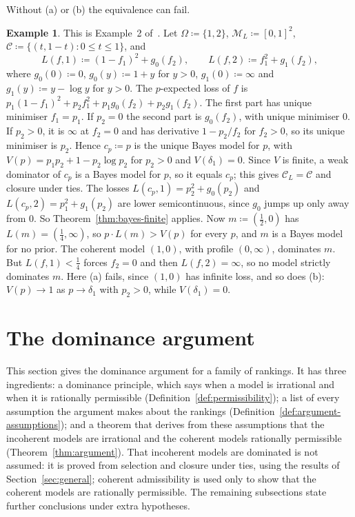 \documentclass[11pt]{article}
\theoremstyle{definition}
\newtheorem{example}[theorem]{Example}
\theoremstyle{remark}
\newcommand{\M}{\mathcal M}
\newcommand{\C}{\mathcal C}
\begin{document}
Without (a) or (b) the equivalence can fail.
\begin{example}\label{ex:ssk-sharp}
This is Example~2 of~\cite{SSK09}. Let $\Omega\coloneqq\{1,2\}$, $\M_L\coloneqq[0,1]^2$, $\C\coloneqq\{(t,1-t):0\le t\le1\}$, and
\[
L(f,1)\coloneqq(1-f_1)^2+g_0(f_2),\qquad L(f,2)\coloneqq f_1^2+g_1(f_2),
\]
where $g_0(0)\coloneqq0$, $g_0(y)\coloneqq1+y$ for $y>0$, $g_1(0)\coloneqq\infty$ and $g_1(y)\coloneqq y-\log y$ for $y>0$. The $p$-expected loss of $f$ is $p_1(1-f_1)^2+p_2f_1^2+p_1g_0(f_2)+p_2g_1(f_2)$. The first part has unique minimiser $f_1=p_1$. If $p_2=0$ the second part is $g_0(f_2)$, with unique minimiser $0$. If $p_2>0$, it is $\infty$ at $f_2=0$ and has derivative $1-p_2/f_2$ for $f_2>0$, so its unique minimiser is $p_2$. Hence $c_p\coloneqq p$ is the unique Bayes model for $p$, with $V(p)=p_1p_2+1-p_2\log p_2$ for $p_2>0$ and $V(\delta_1)=0$. Since $V$ is finite, a weak dominator of $c_p$ is a Bayes model for $p$, so it equals $c_p$; this gives $\C_L=\C$ and closure under ties. The losses $L(c_p,1)=p_2^2+g_0(p_2)$ and $L(c_p,2)=p_1^2+g_1(p_2)$ are lower semicontinuous, since $g_0$ jumps up only away from $0$. So Theorem~\ref{thm:bayes-finite} applies. Now $m\coloneqq(\frac12,0)$ has $L(m)=(\frac14,\infty)$, so $p\cdot L(m)>V(p)$ for every $p$, and $m$ is a Bayes model for no prior. The coherent model $(1,0)$, with profile $(0,\infty)$, dominates $m$. But $L(f,1)<\frac14$ forces $f_2=0$ and then $L(f,2)=\infty$, so no model strictly dominates $m$. Here (a) fails, since $(1,0)$ has infinite loss, and so does (b): $V(p)\to1$ as $p\to\delta_1$ with $p_2>0$, while $V(\delta_1)=0$.
\end{example}

\section{The dominance argument}\label{sec:conclusion}
This section gives the dominance argument for a family of rankings. It has three ingredients: a dominance principle, which says when a model is irrational and when it is rationally permissible (Definition~\ref{def:permissibility}); a list of every assumption the argument makes about the rankings (Definition~\ref{def:argument-assumptions}); and a theorem that derives from these assumptions that the incoherent models are irrational and the coherent models rationally permissible (Theorem~\ref{thm:argument}). That incoherent models are dominated is not assumed: it is proved from selection and closure under ties, using the results of Section~\ref{sec:general}; coherent admissibility is used only to show that the coherent models are rationally permissible. The remaining subsections state further conclusions under extra hypotheses.
\end{document}
